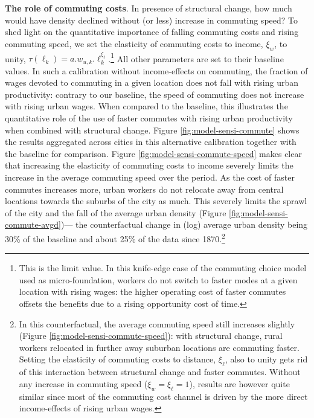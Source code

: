 \documentclass[./20250130-paper.tex]{subfiles}
\begin{document}
\textbf{The role of commuting costs}. In presence of structural change, how much would have density declined without (or less) increase in commuting speed? To shed light on the quantitative importance of falling commuting costs and rising commuting speed, we set the elasticity of commuting costs to income, $\xi_w$, to unity, $\tau(\ell_k)=a.w_{u,k}.\ell_k^{\xi_\ell}$.\footnote{This is the limit value. In this knife-edge case of the commuting choice model used as micro-foundation, workers do not switch to faster modes at a given location with rising wages: the higher operating cost of faster commutes offsets the benefits due to a rising opportunity cost of time.} All other parameters are set to their baseline values. In such a calibration without income-effects on commuting, the fraction of wages devoted to commuting in a given location does not fall with rising urban productivity: contrary to our baseline, the speed of commuting does not increase with rising urban wages. When compared to the baseline, this illustrates the quantitative role of the use of faster commutes with rising urban productivity when combined with structural change. Figure \ref{fig:model-sensi-commute} shows the results aggregated across cities in this alternative calibration together with the baseline for comparison. Figure \ref{fig:model-sensi-commute-speed} makes clear that increasing the elasticity of commuting costs to income severely limits the increase in the average commuting speed over the period. As the cost of faster commutes increases more, urban workers do not relocate away from central locations towards the suburbs of the city as much. This severely limits the sprawl of the city and the fall of the average urban density (Figure \ref{fig:model-sensi-commute-avgd})--- the counterfactual change in (log) average urban density being 30\% of the baseline and about 25\% of the data since 1870.\footnote{In this counterfactual, the average commuting speed still increases slightly (Figure \ref{fig:model-sensi-commute-speed}): with structural change, rural workers relocated in further away suburban locations are commuting faster. Setting the elasticity of commuting costs to distance, $\xi_\ell$, also to unity gets rid of this interaction between structural change and faster commutes. Without any increase in commuting speed ($\xi_w=\xi_\ell=1$), results are however quite similar since most of the commuting cost channel is driven by the more direct income-effects of rising urban wages.}
\end{document}
